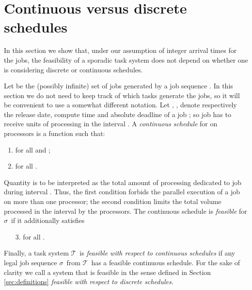 \documentclass{llncs}
\newcommand{\tsys}{\ensuremath{\mathcal{T}}}
\newcommand{\seq}{\ensuremath{\sigma}}
\begin{document}
\section{Continuous versus discrete schedules}
\label{sec:continuous}
In this section we show that, under our assumption of integer arrival times for the jobs, the feasibility of a sporadic task system does not depend on whether one is considering discrete or continuous schedules. 

Let  be the (possibly infinite) set of jobs generated by a job sequence . In this section we do not need to keep track of which tasks generate the jobs, so it will be convenient to use a somewhat different notation. Let , ,  denote respectively the release date, compute time and absolute deadline of a job ; so job  has to receive  units of processing in the interval . A \emph{continuous schedule} for  on  processors is a function  such that:
\begin{enumerate}
\item  for all  and ;
\item  for all .   
\end{enumerate}
Quantity  is to be interpreted as the total amount of processing dedicated to job  during interval . Thus, the first condition forbids the parallel execution of a job on more than one processor; the second condition limits the total volume processed in the interval by the  processors. 
The continuous schedule  is \emph{feasible} for \seq\ if it additionally satisfies 
\begin{enumerate}
\item[3.]  for all .
\end{enumerate}

Finally, a task system \tsys\ is \emph{feasible with respect to continuous schedules} if any legal job sequence \seq\ from \tsys\ has a feasible continuous schedule. For the sake of clarity we call a system that is feasible in the sense defined in Section \ref{sec:definitions} \emph{feasible with respect to discrete schedules}. 
\end{document}
